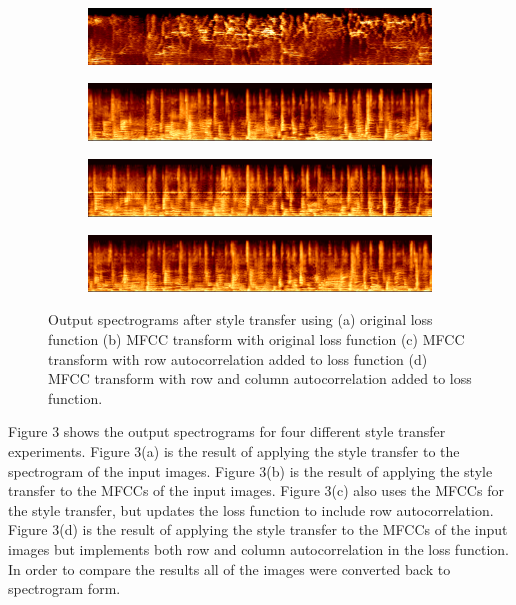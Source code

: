 \documentclass{article}
\begin{document}
\begin{figure}[!h]
\begin{subfigure}{\textwidth}
  \centering
  \includegraphics[width = \textwidth]{out1_spec}
  \caption{}
\end{subfigure}
\begin{subfigure}{\textwidth}
  \centering
  \includegraphics[width = \textwidth]{out2_spec}
  \caption{}
\end{subfigure}
\begin{subfigure}{\textwidth}
  \centering
  \includegraphics[width = \textwidth]{out3_spec}
  \caption{}
\end{subfigure}
\begin{subfigure}{\textwidth}
  \centering
  \includegraphics[width = \textwidth]{out4_spec}
  \caption{}
\end{subfigure}
\caption{Output spectrograms after style transfer using (a) original loss function (b) MFCC transform with original loss function (c) MFCC transform with row autocorrelation added to loss function (d) MFCC transform with row and column autocorrelation added to loss function.}
\end{figure}

Figure 3 shows the output spectrograms for four different style transfer experiments. Figure 3(a) is the result of applying the style transfer to the spectrogram of the input images. Figure 3(b) is the result of applying the style transfer to the MFCCs of the input images. Figure 3(c) also uses the MFCCs for the style transfer, but updates the loss function to include row autocorrelation. Figure 3(d) is the result of applying the style transfer to the MFCCs of the input images but implements both row and column autocorrelation in the loss function. In order to compare the results all of the images were converted back to spectrogram form.
\end{document}
